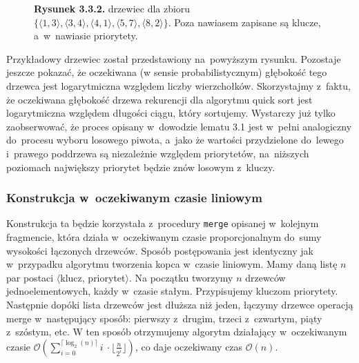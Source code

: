 \documentclass[declaration,shortabstract]{iithesis}
\theoremstyle{definition} \newtheorem{definition}{Definicja}[chapter]
\theoremstyle{remark} \newtheorem{remark}[definition]{Obserwacja}
\theoremstyle{plain} \newtheorem{theorem}[definition]{Twierdzenie}
\theoremstyle{remark} \newtheorem{example}{Przykład}[definition]
\theoremstyle{plain} \newtheorem{lemma}[definition]{Lemat}
\begin{document}
\begin{figure}[h]
    \begin{center}
        \caption*{\textbf{Rysunek 3.3.2.} drzewiec dla zbioru $\{ \langle 1, 3 \rangle, \langle 3, 4 \rangle, \langle 4, 1 \rangle, \langle 5, 7 \rangle, \langle 8, 2 \rangle \}$. Poza nawiasem zapisane są klucze, a~w~nawiasie priorytety.}
    \end{center}
\end{figure}

Przykładowy drzewiec został przedstawiony na~powyższym rysunku. Pozostaje jeszcze pokazać, że oczekiwana (w sensie probabilistycznym) głębokość tego drzewca jest logarytmiczna względem liczby wierzchołków. Skorzystajmy z~faktu, że oczekiwana głębokość drzewa rekurencji dla algorytmu quick sort jest logarytmiczna względem długości ciągu, który sortujemy. Wystarczy już tylko zaobserwować, że proces opisany w~dowodzie lematu 3.1 jest w~pełni analogiczny do~procesu wyboru losowego piwota, a~jako że wartości przydzielone do~lewego i~prawego poddrzewa są niezależnie względem priorytetów, na~niższych poziomach największy priorytet będzie znów losowym z~kluczy.

\subsubsection{Konstrukcja w~oczekiwanym czasie liniowym}

Konstrukcja ta będzie korzystała z~procedury \texttt{merge} opisanej w~kolejnym fragmencie, która działa w~oczekiwanym czasie proporcjonalnym do~sumy wysokości łączonych drzewców. Sposób postępowania jest identyczny jak w~przypadku algorytmu tworzenia kopca w~czasie liniowym. Mamy daną listę $n$ par postaci $\langle$klucz, priorytet$\rangle$. Na początku tworzymy $n$ drzewców jednoelementowych, każdy w~czasie stałym. Przypisujemy kluczom priorytety. Następnie dopóki lista drzewców jest dłuższa niż jeden, łączymy drzewce operacją merge w~następujący sposób: pierwszy z~drugim, trzeci z~czwartym, piąty z~szóstym, etc. W ten sposób otrzymujemy algorytm działający w~oczekiwanym czasie $\mathcal{O}( \sum_{i=0}^{\lceil \log_{2}(n) \rceil} i~\cdot \lfloor \frac{n}{2^i} \rfloor)$, co daje oczekiwany czas $\mathcal{O}(n)$.
\end{document}
